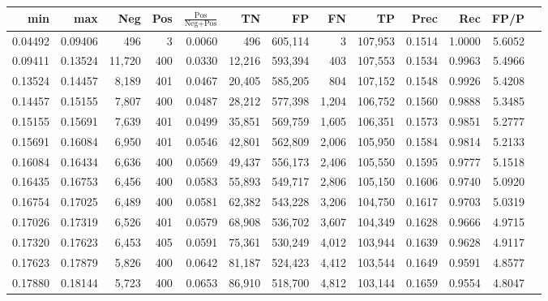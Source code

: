 \begin{tabular}{rrrrrrrrrrrrr}
\toprule
    min &     max &    Neg & Pos & $\frac{\text{Pos}}{\text{Neg}+\text{Pos}}$ &      TN &      FP &      FN &      TP &   Prec &    Rec &   FP/P \\
\midrule
0.04492 & 0.09406 &    496 &   3 &                                     0.0060 &     496 & 605,114 &       3 & 107,953 & 0.1514 & 1.0000 & 5.6052 \\
0.09411 & 0.13524 & 11,720 & 400 &                                     0.0330 &  12,216 & 593,394 &     403 & 107,553 & 0.1534 & 0.9963 & 5.4966 \\
0.13524 & 0.14457 &  8,189 & 401 &                                     0.0467 &  20,405 & 585,205 &     804 & 107,152 & 0.1548 & 0.9926 & 5.4208 \\
0.14457 & 0.15155 &  7,807 & 400 &                                     0.0487 &  28,212 & 577,398 &   1,204 & 106,752 & 0.1560 & 0.9888 & 5.3485 \\
0.15155 & 0.15691 &  7,639 & 401 &                                     0.0499 &  35,851 & 569,759 &   1,605 & 106,351 & 0.1573 & 0.9851 & 5.2777 \\
0.15691 & 0.16084 &  6,950 & 401 &                                     0.0546 &  42,801 & 562,809 &   2,006 & 105,950 & 0.1584 & 0.9814 & 5.2133 \\
0.16084 & 0.16434 &  6,636 & 400 &                                     0.0569 &  49,437 & 556,173 &   2,406 & 105,550 & 0.1595 & 0.9777 & 5.1518 \\
0.16435 & 0.16753 &  6,456 & 400 &                                     0.0583 &  55,893 & 549,717 &   2,806 & 105,150 & 0.1606 & 0.9740 & 5.0920 \\
0.16754 & 0.17025 &  6,489 & 400 &                                     0.0581 &  62,382 & 543,228 &   3,206 & 104,750 & 0.1617 & 0.9703 & 5.0319 \\
0.17026 & 0.17319 &  6,526 & 401 &                                     0.0579 &  68,908 & 536,702 &   3,607 & 104,349 & 0.1628 & 0.9666 & 4.9715 \\
0.17320 & 0.17623 &  6,453 & 405 &                                     0.0591 &  75,361 & 530,249 &   4,012 & 103,944 & 0.1639 & 0.9628 & 4.9117 \\
0.17623 & 0.17879 &  5,826 & 400 &                                     0.0642 &  81,187 & 524,423 &   4,412 & 103,544 & 0.1649 & 0.9591 & 4.8577 \\
0.17880 & 0.18144 &  5,723 & 400 &                                     0.0653 &  86,910 & 518,700 &   4,812 & 103,144 & 0.1659 & 0.9554 & 4.8047 \\

\end{tabular}
